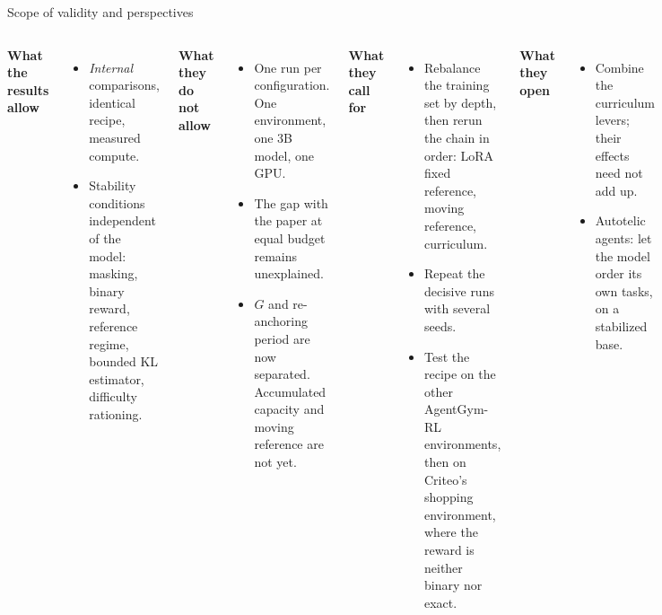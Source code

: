 \documentclass[aspectratio=169,10pt]{beamer}
\begin{document}
\begin{frame}{Scope of validity and perspectives}
\footnotesize
\begin{columns}[T]
\textbf{What the results allow}
\begin{itemize}
  \item \emph{Internal} comparisons, identical recipe, measured compute.
  \item Stability conditions independent of the model: masking, binary reward, reference regime, bounded KL estimator, difficulty rationing.
\end{itemize}
\textbf{What they do not allow}
\begin{itemize}
  \item One run per configuration. One environment, one 3B model, one GPU.
  \item The gap with the paper at equal budget remains unexplained.
  \item $G$ and re-anchoring period are now separated. Accumulated capacity and moving reference are not yet.
\end{itemize}
\textbf{What they call for}
\begin{itemize}
  \item Rebalance the training set by depth, then rerun the chain in order: LoRA fixed reference, moving reference, curriculum.
  \item Repeat the decisive runs with several seeds.
  \item Test the recipe on the other AgentGym-RL environments, then on Criteo's shopping environment, where the reward is neither binary nor exact.
\end{itemize}
\textbf{What they open}
\begin{itemize}
  \item Combine the curriculum levers; their effects need not add up.
  \item Autotelic agents: let the model order its own tasks, on a stabilized base.
\end{itemize}
\end{columns}
\end{frame}
\end{document}
